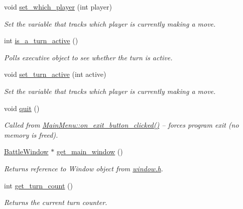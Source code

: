 \begin{DoxyCompactItemize}
void \mbox{\hyperlink{classExecutive_acf7839b1ac33deb79af36c654a7c5afa}{set\+\_\+which\+\_\+player}} (int player)
\begin{DoxyCompactList}\small\item\em Set the variable that tracks which player is currently making a move. \end{DoxyCompactList}\item 
int \mbox{\hyperlink{classExecutive_aeb65d64eb9c379f4bb55cd42e3c9e961}{is\+\_\+a\+\_\+turn\+\_\+active}} ()
\begin{DoxyCompactList}\small\item\em Polls executive object to see whether the turn is active. \end{DoxyCompactList}\item 
void \mbox{\hyperlink{classExecutive_a9000b97a47537ed955c9e40896829788}{set\+\_\+turn\+\_\+active}} (int active)
\begin{DoxyCompactList}\small\item\em Set the variable that tracks which player is currently making a move. \end{DoxyCompactList}\item 
\mbox{\label{classExecutive_a0b5ec84c4420e2857d68dc0c9efcd423}} 
void \mbox{\hyperlink{classExecutive_a0b5ec84c4420e2857d68dc0c9efcd423}{quit}} ()
\begin{DoxyCompactList}\small\item\em Called from \mbox{\hyperlink{classMainMenu_a9b9f6812f90946e135022cf5826d8eed}{Main\+Menu\+::on\+\_\+exit\+\_\+button\+\_\+clicked()}} -- forces program exit (no memory is freed). \end{DoxyCompactList}\item 
\mbox{\hyperlink{classBattleWindow}{Battle\+Window}} $\ast$ \mbox{\hyperlink{classExecutive_a97b5031314e8a65040de21d6424cb3a2}{get\+\_\+main\+\_\+window}} ()
\begin{DoxyCompactList}\small\item\em Returns reference to Window object from \mbox{\hyperlink{window_8h}{window.\+h}}. \end{DoxyCompactList}\item 
\mbox{\label{classExecutive_afc983eb8910afe18eb8c41f311782048}} 
int \mbox{\hyperlink{classExecutive_afc983eb8910afe18eb8c41f311782048}{get\+\_\+turn\+\_\+count}} ()
\begin{DoxyCompactList}\small\item\em Returns the current turn counter. \end{DoxyCompactList}\item 

\end{DoxyCompactItemize}
